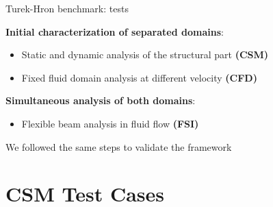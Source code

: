 \documentclass[10pt,t]{beamer}
\begin{document}
\begin{frame}{Turek-Hron benchmark: tests}
    
    \vspace{0.4cm}
    
    \textcolor{fgreen}{\textbf{Initial characterization of separated domains}}:
    
    \vspace{0.4cm}
    
    \begin{itemize}
        \item Static and dynamic analysis of the structural part \textbf{(CSM)}
        \item Fixed fluid domain analysis at different velocity \textbf{(CFD)}
    \end{itemize}

    \vspace{1cm}

    \textcolor{dblue}{\textbf{Simultaneous analysis of both domains}}:

    \vspace{0.4cm}

    \begin{itemize}
        \item Flexible beam analysis in fluid flow \textbf{(FSI)}
    \end{itemize}

    \vspace{1cm}
    
    We followed the same steps to validate the framework
    
\end{frame}


\section{CSM Test Cases}
\end{document}
